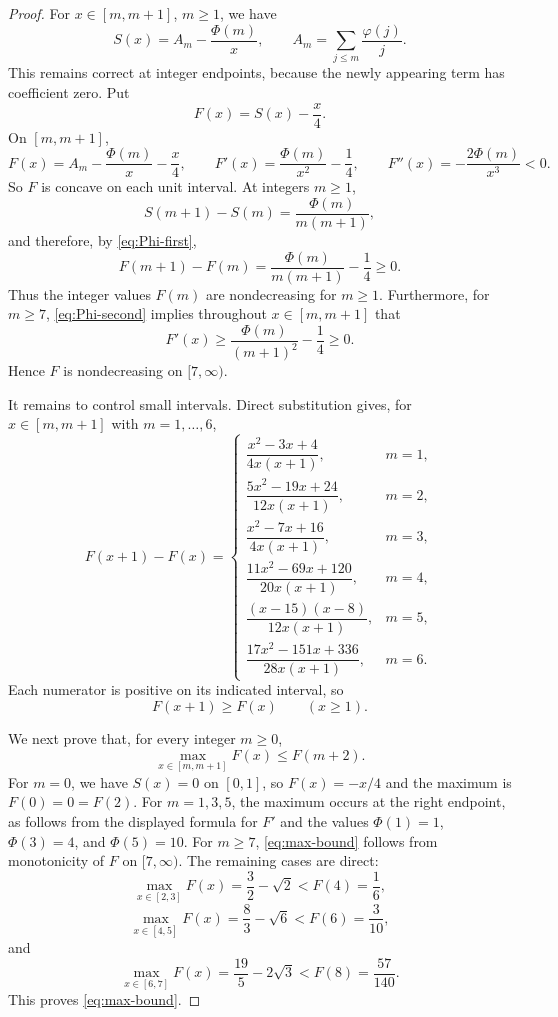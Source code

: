 \documentclass[11pt]{article}
\numberwithin{equation}{section}
\theoremstyle{definition}
\theoremstyle{remark}
\newcommand{\1}{\mathbf 1}
\begin{document}
\begin{proof}
For $x\in[m,m+1]$, $m\ge1$, we have
\[
  S(x)=A_m-\frac{\Phi(m)}x,
  \qquad A_m=\sum_{j\le m}\frac{\varphi(j)}j.
\]
This remains correct at integer endpoints, because the newly appearing term has coefficient zero.  Put
\[
  F(x)=S(x)-\frac x4.
\]
On $[m,m+1]$,
\[
  F(x)=A_m-\frac{\Phi(m)}x-\frac x4,
  \qquad
  F'(x)=\frac{\Phi(m)}{x^2}-\frac14,
  \qquad
  F''(x)=-\frac{2\Phi(m)}{x^3}<0.
\]
So $F$ is concave on each unit interval.  At integers $m\ge1$,
\[
  S(m+1)-S(m)=\frac{\Phi(m)}{m(m+1)},
\]
and therefore, by \eqref{eq:Phi-first},
\[
  F(m+1)-F(m)=\frac{\Phi(m)}{m(m+1)}-\frac14\ge0.
\]
Thus the integer values $F(m)$ are nondecreasing for $m\ge1$.  Furthermore, for $m\ge7$, \eqref{eq:Phi-second} implies throughout $x\in[m,m+1]$ that
\[
  F'(x)\ge \frac{\Phi(m)}{(m+1)^2}-\frac14\ge0.
\]
Hence $F$ is nondecreasing on $[7,\infty)$.

It remains to control small intervals.  Direct substitution gives, for $x\in[m,m+1]$ with $m=1,\ldots,6$,
\[
F(x+1)-F(x)=
\begin{cases}
\dfrac{x^2-3x+4}{4x(x+1)}, & m=1,\\[1.2ex]
\dfrac{5x^2-19x+24}{12x(x+1)}, & m=2,\\[1.2ex]
\dfrac{x^2-7x+16}{4x(x+1)}, & m=3,\\[1.2ex]
\dfrac{11x^2-69x+120}{20x(x+1)}, & m=4,\\[1.2ex]
\dfrac{(x-15)(x-8)}{12x(x+1)}, & m=5,\\[1.2ex]
\dfrac{17x^2-151x+336}{28x(x+1)}, & m=6.
\end{cases}
\]
Each numerator is positive on its indicated interval, so
\begin{equation}\label{eq:F-shift}
  F(x+1)\ge F(x)\qquad(x\ge1).
\end{equation}

We next prove that, for every integer $m\ge0$,
\begin{equation}\label{eq:max-bound}
  \max_{x\in[m,m+1]}F(x)\le F(m+2).
\end{equation}
For $m=0$, we have $S(x)=0$ on $[0,1]$, so $F(x)=-x/4$ and the maximum is $F(0)=0=F(2)$.  For $m=1,3,5$, the maximum occurs at the right endpoint, as follows from the displayed formula for $F'$ and the values $\Phi(1)=1$, $\Phi(3)=4$, and $\Phi(5)=10$.  For $m\ge7$, \eqref{eq:max-bound} follows from monotonicity of $F$ on $[7,\infty)$.  The remaining cases are direct:
\[
  \max_{x\in[2,3]}F(x)=\frac32-\sqrt2<F(4)=\frac16,
\]
\[
  \max_{x\in[4,5]}F(x)=\frac83-\sqrt6<F(6)=\frac3{10},
\]
and
\[
  \max_{x\in[6,7]}F(x)=\frac{19}{5}-2\sqrt3<F(8)=\frac{57}{140}.
\]
This proves \eqref{eq:max-bound}.


\end{proof}
\end{document}
